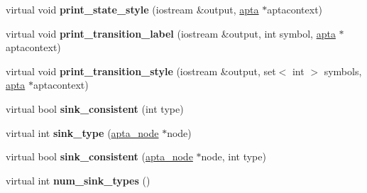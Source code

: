 \begin{DoxyCompactItemize}
\item 
virtual void {\bfseries print\+\_\+state\+\_\+style} (iostream \&output, \hyperlink{classapta}{apta} $\ast$aptacontext)\hypertarget{classevaluation__data_a9bacc9cd9c44c18be1c3870e11b1d91e}{}\label{classevaluation__data_a9bacc9cd9c44c18be1c3870e11b1d91e}

\item 
virtual void {\bfseries print\+\_\+transition\+\_\+label} (iostream \&output, int symbol, \hyperlink{classapta}{apta} $\ast$aptacontext)\hypertarget{classevaluation__data_a019554b17459698f07e6b1a2f7c37f17}{}\label{classevaluation__data_a019554b17459698f07e6b1a2f7c37f17}

\item 
virtual void {\bfseries print\+\_\+transition\+\_\+style} (iostream \&output, set$<$ int $>$ symbols, \hyperlink{classapta}{apta} $\ast$aptacontext)\hypertarget{classevaluation__data_a27bbcfd2623cdb09009a8fe5b4e19879}{}\label{classevaluation__data_a27bbcfd2623cdb09009a8fe5b4e19879}

\item 
virtual bool {\bfseries sink\+\_\+consistent} (int type)\hypertarget{classevaluation__data_a57e587e16e0f829d6430918bd4c07d98}{}\label{classevaluation__data_a57e587e16e0f829d6430918bd4c07d98}

\item 
virtual int {\bfseries sink\+\_\+type} (\hyperlink{classapta__node}{apta\+\_\+node} $\ast$node)\hypertarget{classevaluation__data_aea0d291c08cac12e3098967f431dc4af}{}\label{classevaluation__data_aea0d291c08cac12e3098967f431dc4af}

\item 
virtual bool {\bfseries sink\+\_\+consistent} (\hyperlink{classapta__node}{apta\+\_\+node} $\ast$node, int type)\hypertarget{classevaluation__data_a3fb401f936f3c62bb52a40eae75120a9}{}\label{classevaluation__data_a3fb401f936f3c62bb52a40eae75120a9}

\item 
virtual int {\bfseries num\+\_\+sink\+\_\+types} ()\hypertarget{classevaluation__data_a87192e88df30e8bf1f9625b6699a98ce}{}\label{classevaluation__data_a87192e88df30e8bf1f9625b6699a98ce}

\end{DoxyCompactItemize}
